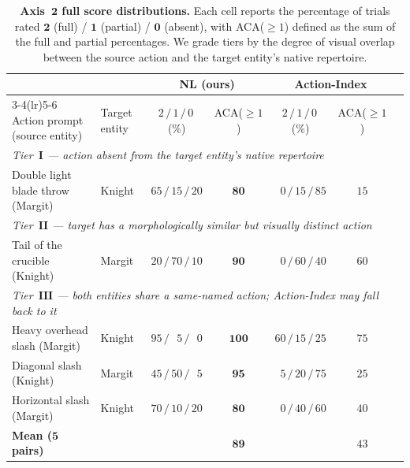 \begin{table}[h]
  \caption{\textbf{Axis~$\mathbf{2}$ full score distributions.} Each cell reports the percentage of trials rated $\mathbf{2}$ (full) / $\mathbf{1}$ (partial) / $\mathbf{0}$ (absent), with ACA($\geq 1$) defined as the sum of the full and partial percentages. We grade tiers by the degree of visual overlap between the source action and the target entity's native repertoire.}
  \label{tab:cross_entity_full}
  \centering
  \setlength{\tabcolsep}{3pt}
  \begin{tabular}{llccccc}
    \toprule
    &     & \multicolumn{2}{c}{\textbf{NL (ours)}} & \multicolumn{2}{c}{\textbf{Action-Index}} \\
    \cmidrule(lr){3-4}\cmidrule(lr){5-6}
    Action prompt (source entity) & Target entity
      & $2\,/\,1\,/\,0$\,(\%) & ACA($\geq 1$)
      & $2\,/\,1\,/\,0$\,(\%) & ACA($\geq 1$) \\
    \midrule
    \multicolumn{6}{l}{\textit{Tier~$\mathbf{I}$ --- action absent from the target entity's native repertoire}} \\
    \quad Double light blade throw (Margit) & Knight
      & $65\,/\,15\,/\,20$           & $\mathbf{80}$
      & $\phantom{0}0\,/\,15\,/\,85$ & $15$           \\
    \midrule
    \multicolumn{6}{l}{\textit{Tier~$\mathbf{II}$ --- target has a morphologically similar but visually distinct action}} \\
    \quad Tail of the crucible (Knight) & Margit
      & $20\,/\,70\,/\,10$           & $\mathbf{90}$
      & $\phantom{0}0\,/\,60\,/\,40$ & $60$           \\
    \midrule
    \multicolumn{6}{l}{\textit{Tier~$\mathbf{III}$ --- both entities share a same-named action; Action-Index may fall back to it}} \\
    \quad Heavy overhead slash (Margit) & Knight
      & $95\,/\,\phantom{0}5\,/\,\phantom{0}0$ & $\mathbf{100}$
      & $60\,/\,15\,/\,25$                     & $75$           \\
    \quad Diagonal slash (Knight)       & Margit
      & $45\,/\,50\,/\,\phantom{0}5$           & $\mathbf{95}$
      & $\phantom{0}5\,/\,20\,/\,75$           & $25$           \\
    \quad Horizontal slash (Margit)     & Knight
      & $70\,/\,10\,/\,20$                     & $\mathbf{80}$
      & $\phantom{0}0\,/\,40\,/\,60$           & $40$           \\
    \midrule
    \textbf{Mean ($\mathbf{5}$ pairs)} & & & $\mathbf{89}$ & & $43$ \\
    \bottomrule
  \end{tabular}
\end{table}

